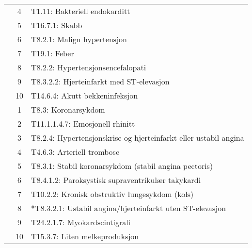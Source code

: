 \begin{table}[htbp]
\begin{tabular}{c c l}
	 & 4 & T1.11: Bakteriell endokarditt \\
	 & 5 & T16.7.1: Skabb \\
	 & 6 & T8.2.1: Malign hypertensjon \\
	 & 7 & T19.1: Feber \\
	 & 8 & T8.2.2: Hypertensjonsencefalopati \\
	 & 9 & T8.3.2.2: Hjerteinfarkt med ST-elevasjon \\
	 & 10 & T14.6.4: Akutt bekkeninfeksjon \\
	\addlinespace
	4 & 1 & T8.3: Koronarsykdom \\
	 & 2 & T11.1.1.4.7: Emosjonell rhinitt \\
	 & 3 & T8.2.4: Hypertensjonskrise og hjerteinfarkt eller ustabil angina \\
	 & 4 & T4.6.3: Arteriell trombose \\
	 & 5 & T8.3.1: Stabil koronarsykdom (stabil angina pectoris) \\
	 & 6 & T8.4.1.2: Paroksystisk supraventrikulær takykardi \\
	 & 7 & T10.2.2: Kronisk obstruktiv lungesykdom (kols) \\
	 & 8 & *T8.3.2.1: Ustabil angina/hjerteinfarkt uten ST-elevasjon \\
	 & 9 & T24.2.1.7: Myokardscintigrafi \\
	 & 10 & T15.3.7: Liten melkeproduksjon \\
	\bottomrule
\end{tabular}
\end{table}

